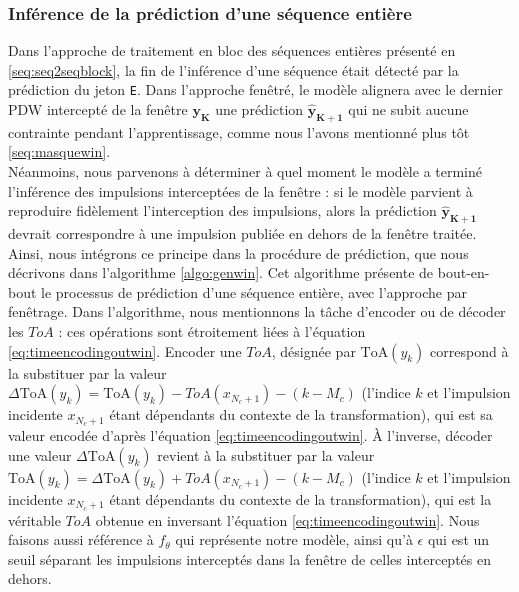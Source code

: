 \subsubsection{Inférence de la prédiction d'une séquence entière}
Dans l'approche de traitement en bloc des séquences entières présenté en \ref{seq:seq2seqblock}, la fin de l'inférence d'une séquence était détecté par la prédiction du jeton \texttt{E}. Dans l'approche fenêtré, le modèle alignera avec le dernier PDW intercepté de la fenêtre $\mathbf{y_K}$ une prédiction $\mathbf{\hat{y}_{K+1}}$ qui ne subit aucune contrainte pendant l'apprentissage, comme nous l'avons mentionné plus tôt \ref{seq:masquewin}.\\

Néanmoins, nous parvenons à déterminer à quel moment le modèle a terminé l'inférence des impulsions interceptées de la fenêtre : si le modèle parvient à reproduire fidèlement l'interception des impulsions, alors la prédiction $\mathbf{\hat{y}_{K+1}}$ devrait correspondre à une impulsion publiée en dehors de la fenêtre traitée.\\

Ainsi, nous intégrons ce principe dans la procédure de prédiction, que nous décrivons dans l'algorithme \ref{algo:genwin}. Cet algorithme présente de bout-en-bout le processus de prédiction d'une séquence entière, avec l'approche par fenêtrage. Dans l'algorithme, nous mentionnons la tâche d'encoder ou de décoder les $ToA$ : ces opérations sont étroitement liées à l'équation \eqref{eq:timeencodingoutwin}. Encoder une $ToA$, désignée par $\text{ToA}(y_k)$ correspond à la substituer par la valeur $\Delta\text{ToA}(y_k) = \text{ToA}(y_k) - ToA(x_{N_c + 1}) - (k - M_c)$ (l'indice $k$ et l'impulsion incidente $x_{N_c + 1}$ étant dépendants du contexte de la transformation), qui est sa valeur encodée d'après l'équation \eqref{eq:timeencodingoutwin}. À l'inverse, décoder une valeur $\Delta\text{ToA}(y_k)$ revient à la substituer par la valeur $\text{ToA}(y_k) = \Delta\text{ToA}(y_k) + ToA(x_{N_c + 1}) - (k - M_c)$ (l'indice $k$ et l'impulsion incidente $x_{N_c + 1}$ étant dépendants du contexte de la transformation), qui est la véritable $ToA$ obtenue en inversant l'équation \eqref{eq:timeencodingoutwin}. Nous faisons aussi référence à $f_{\theta}$ qui représente notre modèle, ainsi qu'à $\epsilon$ qui est un seuil séparant les impulsions interceptés dans la fenêtre de celles interceptés en dehors.\\


